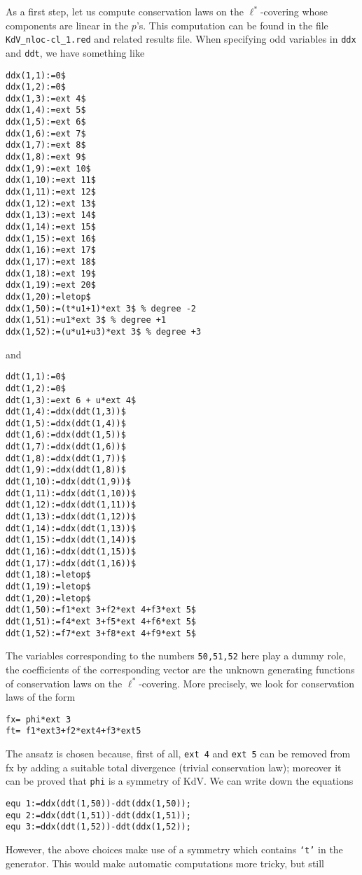 As a first step, let us compute conservation laws on the $\ell^*$-covering
whose components are linear in the $p$'s.  This computation can be found in the
file \texttt{KdV\_nloc-cl\_1.red} and related results file. When specifying odd
variables in \texttt{ddx} and \texttt{ddt}, we have something like
\begin{verbatim}
ddx(1,1):=0$
ddx(1,2):=0$
ddx(1,3):=ext 4$
ddx(1,4):=ext 5$
ddx(1,5):=ext 6$
ddx(1,6):=ext 7$
ddx(1,7):=ext 8$
ddx(1,8):=ext 9$
ddx(1,9):=ext 10$
ddx(1,10):=ext 11$
ddx(1,11):=ext 12$
ddx(1,12):=ext 13$
ddx(1,13):=ext 14$
ddx(1,14):=ext 15$
ddx(1,15):=ext 16$
ddx(1,16):=ext 17$
ddx(1,17):=ext 18$
ddx(1,18):=ext 19$
ddx(1,19):=ext 20$
ddx(1,20):=letop$
ddx(1,50):=(t*u1+1)*ext 3$ % degree -2
ddx(1,51):=u1*ext 3$ % degree +1
ddx(1,52):=(u*u1+u3)*ext 3$ % degree +3
\end{verbatim}
and
\begin{verbatim}
ddt(1,1):=0$
ddt(1,2):=0$
ddt(1,3):=ext 6 + u*ext 4$
ddt(1,4):=ddx(ddt(1,3))$
ddt(1,5):=ddx(ddt(1,4))$
ddt(1,6):=ddx(ddt(1,5))$
ddt(1,7):=ddx(ddt(1,6))$
ddt(1,8):=ddx(ddt(1,7))$
ddt(1,9):=ddx(ddt(1,8))$
ddt(1,10):=ddx(ddt(1,9))$
ddt(1,11):=ddx(ddt(1,10))$
ddt(1,12):=ddx(ddt(1,11))$
ddt(1,13):=ddx(ddt(1,12))$
ddt(1,14):=ddx(ddt(1,13))$
ddt(1,15):=ddx(ddt(1,14))$
ddt(1,16):=ddx(ddt(1,15))$
ddt(1,17):=ddx(ddt(1,16))$
ddt(1,18):=letop$
ddt(1,19):=letop$
ddt(1,20):=letop$
ddt(1,50):=f1*ext 3+f2*ext 4+f3*ext 5$
ddt(1,51):=f4*ext 3+f5*ext 4+f6*ext 5$
ddt(1,52):=f7*ext 3+f8*ext 4+f9*ext 5$
\end{verbatim}
The variables corresponding to the numbers \texttt{50,51,52} here play a dummy
role, the coefficients of the corresponding vector are the unknown generating
functions of conservation laws on the $\ell^*$-covering.
More precisely, we look for conservation laws
of the form
\begin{verbatim}
fx= phi*ext 3
ft= f1*ext3+f2*ext4+f3*ext5
\end{verbatim}
The ansatz is chosen because, first of all, \texttt{ext 4} and \texttt{ext 5}
can be removed from fx by adding a suitable total divergence (trivial
conservation law); moreover it can be proved that \texttt{phi} is a symmetry of
KdV. We can write down the equations
\begin{verbatim}
equ 1:=ddx(ddt(1,50))-ddt(ddx(1,50));
equ 2:=ddx(ddt(1,51))-ddt(ddx(1,51));
equ 3:=ddx(ddt(1,52))-ddt(ddx(1,52));
\end{verbatim}
However, the above choices make use of a symmetry which contains \texttt{`t'}
in the generator. This would make automatic computations more tricky, but still
